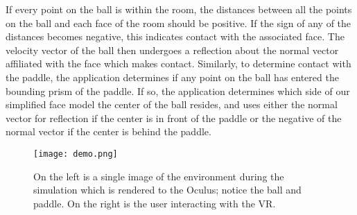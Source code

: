If every point on the ball is within the room, the distances between all the
points on the ball and each face of the room should be positive. If the sign of
any of the distances becomes negative, this indicates contact with the
associated face. The velocity vector of the ball then undergoes a reflection
about the normal vector affiliated with the face which makes contact.
Similarly, to determine contact with the paddle, the application determines if
any point on the ball has entered the bounding prism of the paddle. If so, the
application determines which side of our simplified face model the center of
the ball resides, and uses either the normal vector for reflection if the
center is in front of the paddle or the negative of the normal vector if the
center is behind the paddle.

\begin{figure}[]
\centering
\texttt{[image: demo.png]}
\caption{On the left is a single image of the environment during the simulation
which is rendered to the Oculus; notice the ball and paddle.  On the right is
the user interacting with the VR.}
\label{fig:demo}
\end{figure}
